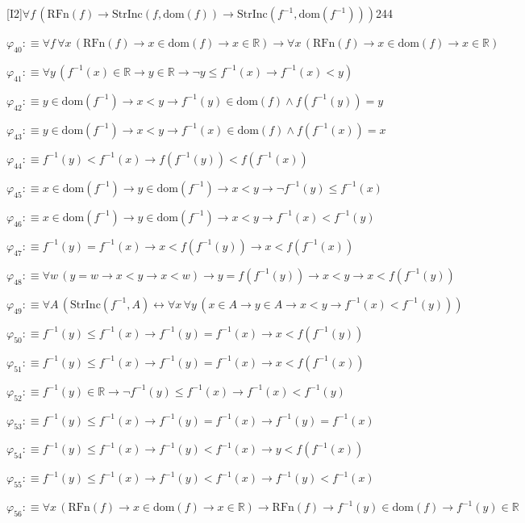 \begin{fullproof}{[I2]}{$\forall f\,(\mathrm{RFn}(f) \to \mathrm{StrInc}(f,\mathrm{dom}(f)) \to \mathrm{StrInc}(f^{-1},\mathrm{dom}(f^{-1})))$}{244}
\begin{abbrevlist}
\item $\varphi_{40} :\equiv \forall f\,\forall x\,(\mathrm{RFn}(f) \to x \in \mathrm{dom}(f) \to x \in \mathbb{R}) \to \forall x\,(\mathrm{RFn}(f) \to x \in \mathrm{dom}(f) \to x \in \mathbb{R})$
\item $\varphi_{41} :\equiv \forall y\,(f^{-1}(x) \in \mathbb{R} \to y \in \mathbb{R} \to \neg y \leq f^{-1}(x) \to f^{-1}(x) < y)$
\item $\varphi_{42} :\equiv y \in \mathrm{dom}(f^{-1}) \to x < y \to f^{-1}(y) \in \mathrm{dom}(f) \land f(f^{-1}(y)) = y$
\item $\varphi_{43} :\equiv y \in \mathrm{dom}(f^{-1}) \to x < y \to f^{-1}(x) \in \mathrm{dom}(f) \land f(f^{-1}(x)) = x$
\item $\varphi_{44} :\equiv f^{-1}(y) < f^{-1}(x) \to f(f^{-1}(y)) < f(f^{-1}(x))$
\item $\varphi_{45} :\equiv x \in \mathrm{dom}(f^{-1}) \to y \in \mathrm{dom}(f^{-1}) \to x < y \to \neg f^{-1}(y) \leq f^{-1}(x)$
\item $\varphi_{46} :\equiv x \in \mathrm{dom}(f^{-1}) \to y \in \mathrm{dom}(f^{-1}) \to x < y \to f^{-1}(x) < f^{-1}(y)$
\item $\varphi_{47} :\equiv f^{-1}(y) = f^{-1}(x) \to x < f(f^{-1}(y)) \to x < f(f^{-1}(x))$
\item $\varphi_{48} :\equiv \forall w\,(y = w \to x < y \to x < w) \to y = f(f^{-1}(y)) \to x < y \to x < f(f^{-1}(y))$
\item $\varphi_{49} :\equiv \forall A\,(\mathrm{StrInc}(f^{-1},A) \leftrightarrow \forall x\,\forall y\,(x \in A \to y \in A \to x < y \to f^{-1}(x) < f^{-1}(y)))$
\item $\varphi_{50} :\equiv f^{-1}(y) \leq f^{-1}(x) \to f^{-1}(y) = f^{-1}(x) \to x < f(f^{-1}(y))$
\item $\varphi_{51} :\equiv f^{-1}(y) \leq f^{-1}(x) \to f^{-1}(y) = f^{-1}(x) \to x < f(f^{-1}(x))$
\item $\varphi_{52} :\equiv f^{-1}(y) \in \mathbb{R} \to \neg f^{-1}(y) \leq f^{-1}(x) \to f^{-1}(x) < f^{-1}(y)$
\item $\varphi_{53} :\equiv f^{-1}(y) \leq f^{-1}(x) \to f^{-1}(y) = f^{-1}(x) \to f^{-1}(y) = f^{-1}(x)$
\item $\varphi_{54} :\equiv f^{-1}(y) \leq f^{-1}(x) \to f^{-1}(y) < f^{-1}(x) \to y < f(f^{-1}(x))$
\item $\varphi_{55} :\equiv f^{-1}(y) \leq f^{-1}(x) \to f^{-1}(y) < f^{-1}(x) \to f^{-1}(y) < f^{-1}(x)$
\item $\varphi_{56} :\equiv \forall x\,(\mathrm{RFn}(f) \to x \in \mathrm{dom}(f) \to x \in \mathbb{R}) \to \mathrm{RFn}(f) \to f^{-1}(y) \in \mathrm{dom}(f) \to f^{-1}(y) \in \mathbb{R}$

\end{abbrevlist}
\end{fullproof}
